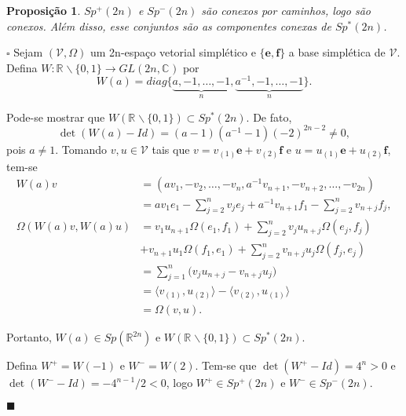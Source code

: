\documentclass[12pt]{book}
\newtheorem{proposicao}[teorema]{Proposição}
\newenvironment{prova}[1]{$\square$ #1}{\hfill$\blacksquare$}
\newcommand{\bigparenteses}[1]{\Big( #1 \Big) }
\newcommand{\complementar}[2]{#1 \backslash #2}
\newcommand{\complexificado}[1]{\mathcal{#1}}
\newcommand{\complexo}[1]{\mathbb{C}^{#1}}
\newcommand{\formaSimpleticaExtendida}[2]{\Omega(#1, #2)}
\newcommand{\generalgroup}[2]{GL(#1, #2)}
\newcommand{\generalgroupcomplexo}[1]{\generalgroup{#1}{\complexo{}}}
\newcommand{\gruposimpletico}[1]{Sp(#1)}
\newcommand{\gruposimpleticonaodegenerado}[1]{Sp^{#1}(2n)}
\newcommand{\produtointerno}[2]{\langle #1, #2 \rangle}
\newcommand{\real}[1]{\mathbb{R}^{#1}}
\newcommand{\reta}{\real{}}
\begin{document}
	\begin{proposicao}\label{proposicao_desconexidade_grupo_simpletico_nao_degenerado}
		$ \gruposimpleticonaodegenerado{+}$ e $\gruposimpleticonaodegenerado{-}$ são conexos por caminhos, logo são conexos. Além disso, esse conjuntos são as componentes conexas de $\gruposimpleticonaodegenerado{*} $.
	\end{proposicao}
	\begin{prova}
		Sejam $(\complexificado{V}, \Omega)$ um 2n-espaço vetorial simplético e $\{\textbf{e}, \textbf{f}\}$ a base simplética de $\complexificado{V}$. Defina $W: \complementar{\reta}{\{0,1\}} \to \generalgroupcomplexo{2n}$ por
		$$
		W(a) = diag\{\underbrace{a, -1, \dots, -1}_{n}, \underbrace{a^{-1}, -1, \dots , -1}_{n}\}.
		$$
		
		Pode-se mostrar que $W(\complementar{\reta}{\{0,1\}}) \subset \gruposimpleticonaodegenerado{*}$. De fato, 
		$$
		\det(W(a)- Id) = (a-1)(a^{-1}-1)(-2)^{2n-2} \neq 0,
		$$
		pois $a\neq 1$. Tomando $v,u \in \complexificado{V}$ tais que $v=v_{(1)}\textbf{e}+ v_{(2)}\textbf{f}$ e $u=u_{(1)}\textbf{e}+ u_{(2)}\textbf{f}$, tem-se 
		$$
		\begin{aligned}	
		W(a)v &= (av_{1}, -v_{2}, \dots, -v_{n}, a^{-1}v_{n+1}, -v_{n+2}, \dots, -v_{2n})
		\\
		&= av_{1}e_{1}  -\sum_{j=2}^{n} v_{j}e_{j} + a^{-1}v_{n+1}f_{1} -\sum_{j=2}^{n} v_{n+j}f_{j},
		\\
		\formaSimpleticaExtendida{W(a)v}{W(a)u} 
		&=v_{1}u_{n+1}\formaSimpleticaExtendida{e_{1}}{f_{1}} + \sum_{j=2}^{n}v_{j}u_{n+j}\formaSimpleticaExtendida{e_{j}}{f_{j}}
		\\
		&+v_{n+1}u_{1}\formaSimpleticaExtendida{f_{1}}{e_{1}} + \sum_{j=2}^{n} v_{n+j}u_{j}\formaSimpleticaExtendida{f_{j}}{e_{j}}
		\\
		&=\sum_{j=1}^{n}\bigparenteses{v_{j}u_{n+j} - 	v_{n+j}u_{j}}
		\\
		&= \produtointerno{v_{(1)}}{u_{(2)}} - \produtointerno{v_{(2)}}{u_{(1)}}
		\\
		&= \formaSimpleticaExtendida{v}{u}.
		\end{aligned}
		$$ 
		
		Portanto, $W(a) \in \gruposimpletico{\real{2n}}$ e $W(\complementar{\reta}{\{0,1\}}) \subset \gruposimpleticonaodegenerado{*}$.
		
		Defina $W^{+} = W(-1)$ e $W^{-} = W(2)$. Tem-se que $\det(W^{+} - Id) = 4^{n}>0$  e $\det(W^{-} - Id) = -4^{n-1}/2 <0$, logo $W^{+}\in \gruposimpleticonaodegenerado{+}$ e $W^{-}\in \gruposimpleticonaodegenerado{-}$. 
		

\end{prova}
\end{document}
